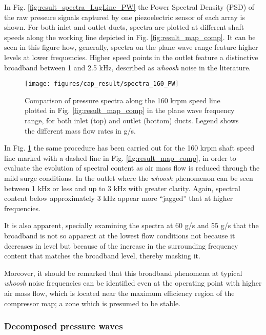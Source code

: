In Fig. \ref{fig:result_spectra_LugLine_PW} the Power Spectral Density (PSD) of the raw pressure signals captured by one piezoelectric sensor of each array is shown. For both inlet and outlet ducts, spectra are plotted at different shaft speeds along the working line depicted in Fig. \ref{fig:result_map_comp}. It can be seen in this figure how, generally, spectra on the plane wave range feature higher levels at lower frequencies. Higher speed points in the outlet feature a distinctive broadband between 1 and 2.5 kHz, described as \emph{whoosh} noise in the literature.

\begin{figure}[tbh!]
\centering
\texttt{[image: figures/cap\_result/spectra\_160\_PW]}
\caption[Spectra along the 160 krpm line in the plane wave range]{Comparison of pressure spectra along the 160 krpm speed line plotted in Fig. \ref{fig:result_map_comp} in the plane wave frequency range, for both inlet (top) and outlet (bottom) ducts. Legend shows the different mass flow rates in g/s.}
\label{fig:result_spectra_60_PW}
\end{figure}

In Fig. \ref{fig:result_spectra_60_PW} the same procedure has been carried out for the 160 krpm shaft speed line marked with a dashed line in Fig. \ref{fig:result_map_comp}, in order to evaluate the evolution of spectral content as air mass flow is reduced through the mild surge conditions. In the outlet where the \emph{whoosh} phenomenon can be seen between 1 kHz or less and up to 3 kHz with greater clarity. Again, spectral content below approximately 3 kHz appear more ``jagged'' that at higher frequencies.

It is also apparent, specially examining the spectra at 60 g/s and 55 g/s that the broadband is not so apparent at the lowest flow conditions not because it decreases in level but because of the increase in the surrounding frequency content that matches the broadband level, thereby masking it. 

Moreover, it should be remarked that this broadband phenomena at typical \emph{whoosh} noise frequencies can be identified even at the operating point with higher air mass flow, which is located near the maximum efficiency region of the compressor map; a zone which is presumed to be stable.

\subsubsection{Decomposed pressure waves}

